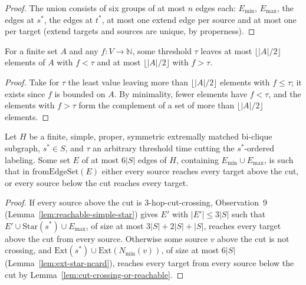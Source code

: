 \begin{proof}
  \leanok
  The union consists of six groups of at most $n$ edges each: $E_{\min}$,
  $E_{\max}$, the edges at $s^*$, the edges at $t^*$, at most one extend edge
  per source and at most one per target (extend targets and sources are
  unique, by properness).
\end{proof}

\begin{lemma}
  \label{lem:exists-threshold}
  \leanok
  For a finite set $A$ and any $f : V \to \mathbb{N}$, some threshold $\tau$
  leaves at most $\lfloor |A| / 2 \rfloor$ elements of $A$ with $f < \tau$ and
  at most $\lfloor |A| / 2 \rfloor$ with $f > \tau$.
\end{lemma}

\begin{proof}
  \leanok
  Take for $\tau$ the least value leaving more than $\lfloor |A| / 2 \rfloor$
  elements with $f \le \tau$; it exists since $f$ is bounded on $A$. By
  minimality, fewer elements have $f < \tau$, and the elements with $f > \tau$
  form the complement of a set of more than $\lfloor |A| / 2 \rfloor$ elements.
\end{proof}

\begin{lemma}
  \label{lem:reachable-half}
  \leanok
  Let $H$ be a finite, simple, proper, symmetric extremally matched bi-clique
  subgraph, $s^* \in S$, and $\tau$ an arbitrary threshold time cutting the
  $s^*$-ordered labeling. Some set $E$ of at most $6|S|$ edges of $H$,
  containing $E_{\min} \cup E_{\max}$, is such that in
  $\mathrm{fromEdgeSet}(E)$ either every source reaches every target above the
  cut, or every source below the cut reaches every target.
\end{lemma}

\begin{proof}
  \leanok
  If every source above the cut is $3$-hop-cut-crossing, Observation~9
  (Lemma~\ref{lem:reachable-simple-star}) gives $E'$ with $|E'| \le 3|S|$ such
  that $E' \cup \mathrm{Star}(s^*) \cup E_{\max}$, of size at most
  $3|S| + 2|S| + |S|$, reaches every target above the cut from every source.
  Otherwise some source $v$ above the cut is not crossing, and
  $\mathrm{Ext}(s^*) \cup \mathrm{Ext}(N_{\min}(v))$, of size at most $6|S|$
  (Lemma~\ref{lem:ext-star-ncard}), reaches every target from every source
  below the cut by Lemma~\ref{lem:cut-crossing-or-reachable}.
\end{proof}

